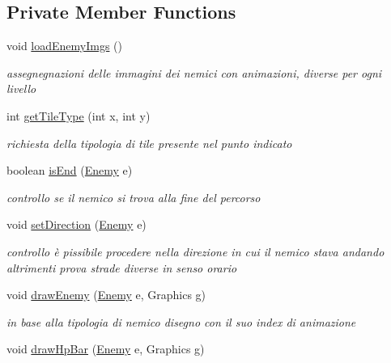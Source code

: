 \subsection*{Private Member Functions}
\begin{DoxyCompactItemize}
\item 
void \hyperlink{classmanagers_1_1_enemy_manager_a774aefe7ec0626eb37d65a2335eade3b}{load\+Enemy\+Imgs} ()
\begin{DoxyCompactList}\small\item\em assegnegnazioni delle immagini dei nemici con animazioni, diverse per ogni livello \end{DoxyCompactList}\item 
int \hyperlink{classmanagers_1_1_enemy_manager_ac689e72523c8460ac3160526d310b1b7}{get\+Tile\+Type} (int x, int y)
\begin{DoxyCompactList}\small\item\em richiesta della tipologia di tile presente nel punto indicato \end{DoxyCompactList}\item 
boolean \hyperlink{classmanagers_1_1_enemy_manager_afec98871c0e021759b9d0afc8b690a18}{is\+End} (\hyperlink{classenemies_1_1_enemy}{Enemy} e)
\begin{DoxyCompactList}\small\item\em controllo se il nemico si trova alla fine del percorso \end{DoxyCompactList}\item 
void \hyperlink{classmanagers_1_1_enemy_manager_a839e4729819875981f138997b2d3f438}{set\+Direction} (\hyperlink{classenemies_1_1_enemy}{Enemy} e)
\begin{DoxyCompactList}\small\item\em controllo è pissibile procedere nella direzione in cui il nemico stava andando altrimenti prova strade diverse in senso orario \end{DoxyCompactList}\item 
void \hyperlink{classmanagers_1_1_enemy_manager_a7ebdd9acefa4682b23b1ad2c0be558f4}{draw\+Enemy} (\hyperlink{classenemies_1_1_enemy}{Enemy} e, Graphics g)
\begin{DoxyCompactList}\small\item\em in base alla tipologia di nemico disegno con il suo index di animazione \end{DoxyCompactList}\item 
void \hyperlink{classmanagers_1_1_enemy_manager_a9c98cd29298e5f583c52dc46a6d70d46}{draw\+Hp\+Bar} (\hyperlink{classenemies_1_1_enemy}{Enemy} e, Graphics g)

\end{DoxyCompactItemize}
